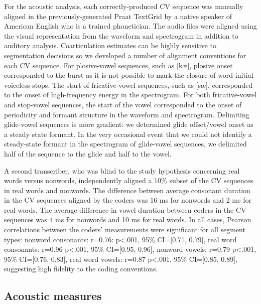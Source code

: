 \documentclass[a4paper,man,natbib,donotrepeattitle, apacite]{apa6}
\begin{document}
For the acoustic analysis, each correctly-produced CV sequence was manually aligned in the previously-generated Praat TextGrid \cite{boersmaPraatDoingPhonetics2018} by a native speaker of American English who is a trained phonetician. The audio files were aligned using the visual representation from the waveform and spectrogram in addition to auditory analysis. Coarticulation estimates can be highly sensitive to segmentation decisions so we developed a number of alignment conventions for each CV sequence. For plosive-vowel sequences, such as [k\ae], plosive onset corresponded to the burst as it is not possible to mark the closure of word-initial voiceless stops. The start of fricative-vowel sequences, such as [s\ae], corresponded to the onset of high-frequency energy in the spectrogram. For both fricative-vowel and stop-vowel sequences, the start of the vowel corresponded to the onset of periodicity and formant structure in the waveform and spectrogram. Delimiting glide-vowel sequences is more gradient: we determined glide offset/vowel onset as a steady state formant. In the very occasional event that we could not identify a steady-state formant in the spectrogram of glide-vowel sequences, we delimited half of the sequence to the glide and half to the vowel. 

A second transcriber, who was blind to the study hypothesis concerning real words versus nonwords, independently aligned a 10\% subset of the CV sequences in real words and nonwords. The difference between average consonant duration in the CV sequences aligned by the coders was 16 ms for nonwords and 2 ms for real words. The average difference in vowel duration between coders in the CV sequences was 4 ms for nonwords and 10 ms for real words. In all cases, Pearson correlations between the coders’ measurements were significant for all segment types: nonword consonants: r=0.76: p<.001, 95\% CI=[0.71, 0.79], real word consonants: r=0.96 p<.001, 95\% CI=[0.95, 0.96], nonword vowels: r=0.79 p<.001, 95\% CI=[0.76, 0.83], real word vowels: r=0.87 p<.001, 95\% CI=[0.85, 0.89], suggesting high fidelity to the coding conventions. 

\subsection{Acoustic measures}
\end{document}
